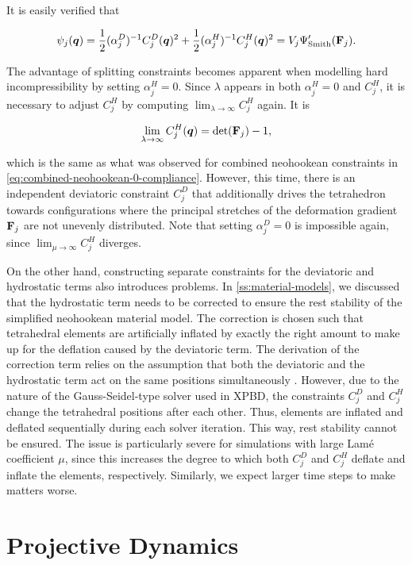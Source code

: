 \noindent It is easily verified that

\[
    \psi_j(\bm{q}) = \frac{1}{2}(\alpha^{D}_j)^{-1} C^D_j(\bm{q})^2 + \frac{1}{2}(\alpha^{H}_j)^{-1} C^H_j(\bm{q})^2 
    = V_j\Psi^\prime_{\text{Smith}}(\mathbf{F}_j).
\]

The advantage of splitting constraints becomes apparent when modelling hard incompressibility by setting $\alpha^H_j = 0$. Since $\lambda$ 
appears in both $\alpha^H_j = 0$ and $C^H_j$, it is necessary to adjust $C^H_j$ by computing $\lim_{\lambda\to\infty}C^H_j$ again. It is 

\[
    \lim_{\lambda\to\infty}C^H_j(\bm{q}) = \text{det}(\mathbf{F}_j) - 1,
\]

\noindent which is the same as what was observed for combined neohookean constraints in \autoref{eq:combined-neohookean-0-compliance}.
However, this time, there is an independent deviatoric constraint $C^D_j$ that additionally drives the tetrahedron towards configurations 
where the principal stretches of the deformation gradient $\mathbf{F}_j$ are not unevenly distributed. Note that setting $\alpha^D_j = 0$ is 
impossible again, since $\lim_{\mu\to\infty}C^H_j$ diverges.

On the other hand, constructing separate constraints for the deviatoric and hydrostatic terms also introduces problems. In 
\autoref{ss:material-models},
we discussed that the hydrostatic term needs to be corrected to ensure the rest stability of the simplified neohookean material model. The 
correction is chosen such that tetrahedral elements are artificially inflated by exactly the right amount to make up for the deflation caused 
by the deviatoric term. The derivation of the correction term relies on the assumption that both the deviatoric and the hydrostatic term act 
on the same positions simultaneously \cite{smith2018}. However, due to the nature of the Gauss-Seidel-type solver used in XPBD, the constraints 
$C^D_j$ and $C^H_j$ change the tetrahedral positions after each other. Thus, elements are inflated and deflated sequentially during each solver 
iteration. This way, rest stability cannot be ensured. The issue is particularly severe for simulations with large Lamé coefficient $\mu$, 
since this increases the degree to which both $C^D_j$ and $C^H_j$ deflate and inflate the elements, respectively. Similarly, we expect 
larger time steps to make matters worse.

\section{Projective Dynamics}\label{s:pd}

